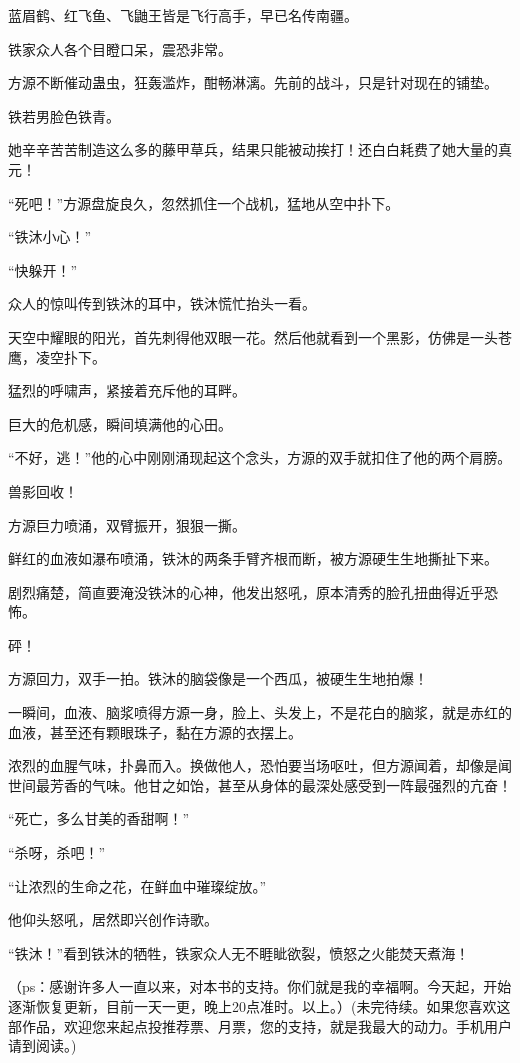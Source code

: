 \begin{this_body}
蓝眉鹤、红飞鱼、飞鼬王皆是飞行高手，早已名传南疆。

铁家众人各个目瞪口呆，震恐非常。

方源不断催动蛊虫，狂轰滥炸，酣畅淋漓。先前的战斗，只是针对现在的铺垫。

铁若男脸色铁青。

她辛辛苦苦制造这么多的藤甲草兵，结果只能被动挨打！还白白耗费了她大量的真元！

“死吧！”方源盘旋良久，忽然抓住一个战机，猛地从空中扑下。

“铁沐小心！”

“快躲开！”

众人的惊叫传到铁沐的耳中，铁沐慌忙抬头一看。

天空中耀眼的阳光，首先刺得他双眼一花。然后他就看到一个黑影，仿佛是一头苍鹰，凌空扑下。

猛烈的呼啸声，紧接着充斥他的耳畔。

巨大的危机感，瞬间填满他的心田。

“不好，逃！”他的心中刚刚涌现起这个念头，方源的双手就扣住了他的两个肩膀。

兽影回收！

方源巨力喷涌，双臂振开，狠狠一撕。

鲜红的血液如瀑布喷涌，铁沐的两条手臂齐根而断，被方源硬生生地撕扯下来。

剧烈痛楚，简直要淹没铁沐的心神，他发出怒吼，原本清秀的脸孔扭曲得近乎恐怖。

砰！

方源回力，双手一拍。铁沐的脑袋像是一个西瓜，被硬生生地拍爆！

一瞬间，血液、脑浆喷得方源一身，脸上、头发上，不是花白的脑浆，就是赤红的血液，甚至还有颗眼珠子，黏在方源的衣摆上。

浓烈的血腥气味，扑鼻而入。换做他人，恐怕要当场呕吐，但方源闻着，却像是闻世间最芳香的气味。他甘之如饴，甚至从身体的最深处感受到一阵最强烈的亢奋！

“死亡，多么甘美的香甜啊！”

“杀呀，杀吧！”

“让浓烈的生命之花，在鲜血中璀璨绽放。”

他仰头怒吼，居然即兴创作诗歌。

“铁沐！”看到铁沐的牺牲，铁家众人无不睚眦欲裂，愤怒之火能焚天煮海！

（ps：感谢许多人一直以来，对本书的支持。你们就是我的幸福啊。今天起，开始逐渐恢复更新，目前一天一更，晚上20点准时。以上。）(未完待续。如果您喜欢这部作品，欢迎您来起点投推荐票、月票，您的支持，就是我最大的动力。手机用户请到阅读。)

\end{this_body}

